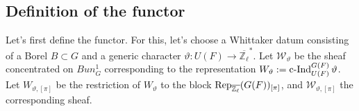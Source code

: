 %
%
%

%
%

\subsection{Definition of the functor}

Let's first define the functor. For this, let's choose a Whittaker datum consisting of a Borel $B \subset G$ and a generic character $\vartheta: U(F) \to \overline{\mathbb{Z}_{\ell}}^*$. Let $\mathcal{W}_{\vartheta}$ be the sheaf concentrated on $Bun_G^1$ corresponding to the representation $W_{\vartheta}:=\operatorname{\operatorname{c-Ind}}_{U(F)}^{G(F)}\vartheta$. Let $W_{\vartheta, [\pi]}$ be the restriction of $W_{\vartheta}$ to the block $\operatorname{\operatorname{Rep}}_{\overline{\mathbb{Z}_{\ell}}}(G(F))_{[\pi]}$, and $\mathcal{W}_{\vartheta, [\pi]}$ the corresponding sheaf.

